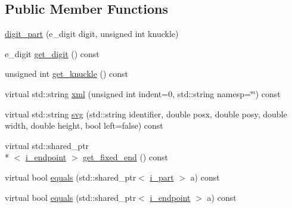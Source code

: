 \subsection*{Public Member Functions}
\begin{DoxyCompactItemize}
\item 
\hyperlink{classmae_1_1fl_1_1laban_1_1ps_1_1digit__part_a4f81dd510be4efc56b501edf7eb57ecf}{digit\-\_\-part} (e\-\_\-digit digit, unsigned int knuckle)
\item 
e\-\_\-digit \hyperlink{classmae_1_1fl_1_1laban_1_1ps_1_1digit__part_a1e0d08a914859b24ffbabec5bd9f87a8}{get\-\_\-digit} () const 
\item 
unsigned int \hyperlink{classmae_1_1fl_1_1laban_1_1ps_1_1digit__part_a50eba0820368e7315d84f3782238e646}{get\-\_\-knuckle} () const 
\item 
virtual std\-::string \hyperlink{classmae_1_1fl_1_1laban_1_1ps_1_1digit__part_a51e9b056b0d57310e1423efbf8ebec48}{xml} (unsigned int indent=0, std\-::string namesp=\char`\"{}\char`\"{}) const 
\item 
virtual std\-::string \hyperlink{classmae_1_1fl_1_1laban_1_1ps_1_1digit__part_a4f9204b03aaf808940d32d1b6a3ea325}{svg} (std\-::string identifier, double posx, double posy, double width, double height, bool left=false) const 
\item 
virtual std\-::shared\-\_\-ptr\\*
$<$ \hyperlink{classmae_1_1fl_1_1laban_1_1ps_1_1i__endpoint}{i\-\_\-endpoint} $>$ \hyperlink{classmae_1_1fl_1_1laban_1_1ps_1_1digit__part_ad8f600cbaccf7194ea70c93432a1e9b5}{get\-\_\-fixed\-\_\-end} () const 
\item 
virtual bool \hyperlink{classmae_1_1fl_1_1laban_1_1ps_1_1digit__part_a6bcdd921e55c60908e827534d4957c4d}{equals} (std\-::shared\-\_\-ptr$<$ \hyperlink{classmae_1_1fl_1_1laban_1_1ps_1_1i__part}{i\-\_\-part} $>$ a) const 
\item 
virtual bool \hyperlink{classmae_1_1fl_1_1laban_1_1ps_1_1digit__part_a0966a987076279fe198566b953bbc7a3}{equals} (std\-::shared\-\_\-ptr$<$ \hyperlink{classmae_1_1fl_1_1laban_1_1ps_1_1i__endpoint}{i\-\_\-endpoint} $>$ a) const 
\end{DoxyCompactItemize}


